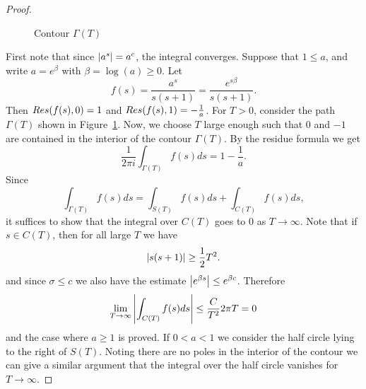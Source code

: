 \begin{proof}
\begin{figure}[!htb]
\begin{minipage}[c]{0.5\textwidth}
\end{minipage}
\caption{Contour $\Gamma(T)$}
\label{fig:ContourGamma}
\end{figure}
	First note that since $\left|a^s\right| = a^c$, the integral converges. Suppose that $1 \leq a$, and write $a = e^\beta$ with $\beta = \log(a) \geq 0$. Let
\begin{equation*}
	f(s) = \frac{a^s}{s(s + 1)} = \frac{e^{s \beta}}{s(s + 1)}.
\end{equation*}
	Then $\mathop{Res}(f(s), 0) = 1$ and $\mathop{Res}(f(s), 1) = -\frac{1}{a}$. For $T > 0$, consider the path $\Gamma(T)$ shown in Figure~\ref{fig:ContourGamma}. Now, we choose $T$ large enough such that $0$ and $-1$ are contained in the interior of the contour $\Gamma(T)$. By the residue formula we get
\begin{equation*}
	\frac{1}{2 \pi i} \int _{\Gamma(T)} f(s) ds = 1 - \frac{1}{a}.
\end{equation*}
	Since
\begin{equation*}
	\int _{\Gamma(T)} f(s) ds = \int _{S(T)} f(s) ds + \int _{C(T)} f(s) ds,
\end{equation*}
	it suffices to show that the integral over $C(T)$ goes to $0$ as $T \to \infty$. Note that if $s \in C(T)$, then for all large $T$ we have
\begin{equation*}
	\left|s(s + 1)\right| \geq \frac{1}{2} T^2.
\end{equation*}
	and since $\sigma \leq c$ we also have the estimate $\left|e^{\beta s}\right| \leq e^{\beta c}$. Therefore
\begin{equation*}
	\lim _{T \to \infty} \left|\int _{C(T)} f(s) ds\right| \leq \frac{C}{T^2} 2 \pi T = 0
\end{equation*}
	and the case where $a \geq 1$ is proved. If $0 < a < 1$ we consider the half circle lying to the right of $S(T)$. Noting there are no poles in the interior of the contour we can give a similar argument that the integral over the half circle vanishes for $T \to \infty$.
\end{proof}


